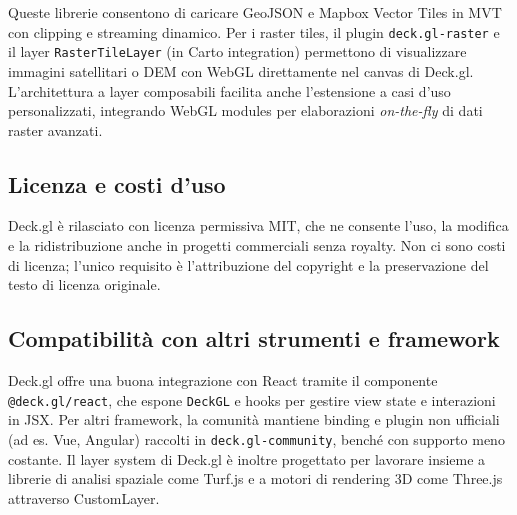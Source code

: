 Queste librerie consentono di caricare GeoJSON e Mapbox Vector Tiles in MVT con
clipping e streaming dinamico\cite{deckgl-vector,deckgl-mvtlayer}. Per i raster
tiles, il plugin \texttt{deck.gl-raster} e il layer \texttt{RasterTileLayer} (in
Carto integration) permettono di visualizzare immagini satellitari o DEM con WebGL
direttamente nel canvas di Deck.gl. L'architettura a layer composabili facilita
anche l'estensione a casi d'uso personalizzati, integrando WebGL modules per elaborazioni
\textit{on-the-fly} di dati raster avanzati\cite{deckgl-maptiler,deckgl-raster-plugin}.

\subsection{Licenza e costi d'uso}
Deck.gl è rilasciato con licenza permissiva MIT, che ne consente l'uso, la modifica
e la ridistribuzione anche in progetti commerciali senza royalty.
\cite{deckgl-license} Non ci sono costi di licenza; l'unico requisito è l'attribuzione
del copyright e la preservazione del testo di licenza originale.

\subsection{Compatibilità con altri strumenti e framework}
Deck.gl offre una buona integrazione con React tramite il componente \texttt{@deck.gl/react},
che espone \texttt{DeckGL} e hooks per gestire view state e interazioni in JSX. \cite{deckgl-react}
Per altri framework, la comunità mantiene binding e plugin non ufficiali (ad es.
Vue, Angular) raccolti in \texttt{deck.gl-community}, benché con supporto meno
costante. \cite{deckgl-community} Il layer system di Deck.gl è inoltre progettato
per lavorare insieme a librerie di analisi spaziale come Turf.js e a motori di rendering
3D come Three.js attraverso CustomLayer.

\newpage